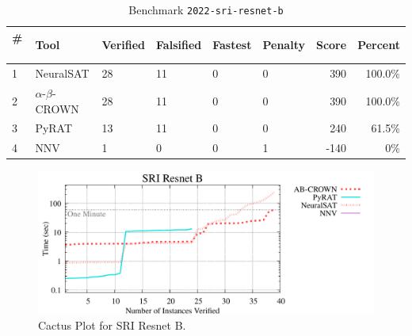 
\begin{table}[h]
\begin{center}
\caption{Benchmark \texttt{2022-sri-resnet-b}} \label{tab:cat_{cat}}
{\setlength{\tabcolsep}{2pt}
\begin{tabular}[h]{@{}llllllrr@{}}
\toprule
\textbf{\# ~} & \textbf{Tool} & \textbf{Verified} & \textbf{Falsified} & \textbf{Fastest} & \textbf{Penalty} & \textbf{Score} & \textbf{Percent}\\
\midrule
1 & NeuralSAT & 28 & 11 & 0 & 0 & 390 & 100.0\% \\
2 & $\alpha$-$\beta$-CROWN & 28 & 11 & 0 & 0 & 390 & 100.0\% \\
3 & PyRAT & 13 & 11 & 0 & 0 & 240 & 61.5\% \\
4 & NNV & 1 & 0 & 0 & 1 & -140 & 0\% \\
\bottomrule
\end{tabular}
}
\end{center}
\end{table}



\begin{figure}[h]
\centerline{\includegraphics[width=\textwidth]{cactus/2022_sri_resnet_b.pdf}}
\caption{Cactus Plot for SRI Resnet B.}
\label{fig:quantPic}
\end{figure}



